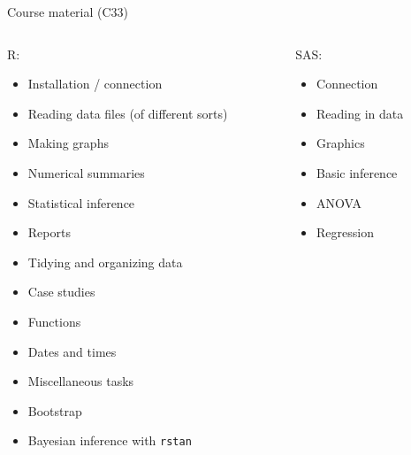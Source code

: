 \documentclass[ignorenonframetext,]{beamer}
\begin{document}
\begin{frame}{Course material (C33)}
\protect\hypertarget{course-material-c33}{}

\begin{columns}
  \begin{column}{0.6\textwidth}
    R:
    \begin{itemize}
\item Installation / connection
\item Reading data files (of different sorts)
\item Making graphs
\item Numerical summaries
\item Statistical inference
\item Reports
\item Tidying and organizing data
\item Case studies
\item Functions
\item Dates and times
\item Miscellaneous tasks
\item Bootstrap
\item Bayesian inference with \texttt{rstan}

    \end{itemize}
  \end{column}
  
  \begin{column}{0.4\textwidth}
  SAS:
  \begin{itemize}
  \item Connection 
\item Reading in data
\item Graphics
\item Basic inference
\item ANOVA
\item Regression 
  
  \end{itemize}
  \end{column}
\end{columns}

\end{frame}
\end{document}
